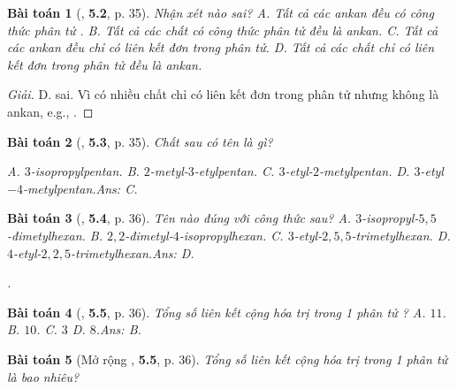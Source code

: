 \documentclass{article}
\numberwithin{equation}{section}
\newtheorem{baitoan}{Bài toán}[section]
\begin{document}
\begin{baitoan}[\cite{SBT_Hoa_Hoc_11_co_ban}, \textbf{5.2}, p. 35]
	Nhận xét nào sai? {\sf A.} Tất cả các ankan đều có công thức phân tử \emph{}. {\sf B.} Tất cả các chất có công thức phân tử \emph{} đều là ankan. {\sf C.} Tất cả các ankan đều chỉ có liên kết đơn trong phân tử. {\sf D.} Tất cả các chất chỉ có liên kết đơn trong phân tử đều là ankan.
\end{baitoan}

\begin{proof}[Giải]
	{\sf D.} sai. Vì có nhiều chất chỉ có liên kết đơn trong phân tử nhưng không là ankan, e.g., .
\end{proof}

\begin{baitoan}[\cite{SBT_Hoa_Hoc_11_co_ban}, \textbf{5.3}, p. 35]
	Chất sau có tên là gì?
	\begin{center}
	\end{center}
	{\sf A.} $3$-isopropylpentan. {\sf B.} $2$-metyl-$3$-etylpentan. {\sf C.} $3$-etyl-$2$-metylpentan. {\sf D.} $3$-etyl$-4$-metylpentan.\hfill{\sf Ans: C.}
\end{baitoan}

\begin{baitoan}[\cite{SBT_Hoa_Hoc_11_co_ban}, \textbf{5.4}, p. 36]
	Tên nào đúng với công thức sau? {\sf A.} $3$-isopropyl-$5,5$-đimetylhexan. {\sf B.} $2,2$-đimetyl-$4$-isopropylhexan. {\sf C.} $3$-etyl-$2,5,5$-trimetylhexan. {\sf D.} $4$-etyl-$2,2,5$-trimetylhexan.\hfill{\sf Ans: D.}
	\begin{center}
		.
	\end{center}
\end{baitoan}

\begin{baitoan}[\cite{SBT_Hoa_Hoc_11_co_ban}, \textbf{5.5}, p. 36]
	Tổng số liên kết cộng hóa trị trong 1 phân tử \emph{}? {\sf A.} $11$. {\sf B.} $10$. {\sf C.} $3$ {\sf D.} $8$.\hfill{\sf Ans: B.}
\end{baitoan}

\begin{baitoan}[Mở rộng \cite{SBT_Hoa_Hoc_11_co_ban}, \textbf{5.5}, p. 36]
	Tổng số liên kết cộng hóa trị trong 1 phân tử \emph{} là bao nhiêu?
\end{baitoan}
\end{document}
